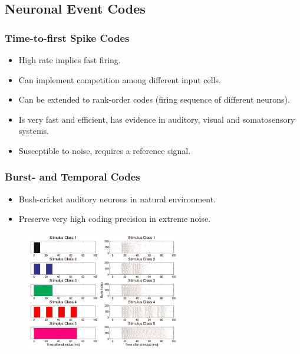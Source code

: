 \documentclass[a4paper, 12pt]{article}
\begin{document}
\subsection{Neuronal Event Codes}
\subsubsection{Time-to-first Spike Codes}
\begin{itemize}[noitemsep,nolistsep]
	\item High rate implies fast firing.
	\item Can implement competition among different input cells.
	\item Can be extended to rank-order codes (firing sequence of different neurons).
	\item Is very fast and efficient, has evidence in auditory, visual and somatosensory systems.
	\item Susceptible to noise, requires a reference signal.
\end{itemize}

\subsubsection{Burst- and Temporal Codes}
\begin{itemize}[noitemsep,nolistsep]
	\item Bush-cricket auditory neurons in natural environment.
	\item Preserve very high coding precision in extreme noise.
\end{itemize}
\begin{figure}[H]
	\centering
	\includegraphics[width=0.6\textwidth]{burst-code.png}
\end{figure}
\end{document}
